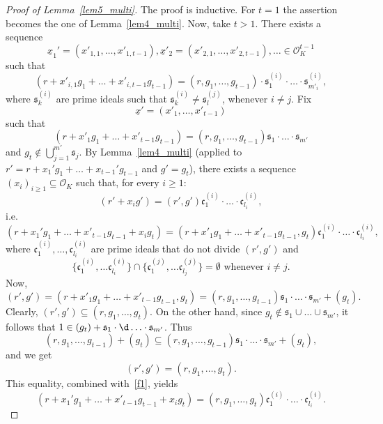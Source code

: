 \documentclass[leqno,a4paper,12pt]{article}
\theoremstyle{definition}
\newcommand{\OK}{\mathcal{O}_K}
\begin{document}
%
%
%
\begin{proof}[Proof of Lemma~\ref{lem5_multi}]
The proof is inductive. For $t=1$ the assertion becomes the one of Lemma~\ref{lem4_multi}. Now, take $t>1$. There exists a sequence
\[
\underline{x}_1'=(x'_{1,1},\dots,x'_{1,t-1}),\underline{x}'_2=(x'_{2,1},\dots,x'_{2,t-1}),\dots \in \OK^{t-1}
\]
such that
\[
(r+x'_{i,1}g_1+\dots+x'_{i,t-1}g_{t-1})=(r,g_1,\dots,g_{t-1})\cdot \mathfrak{s}_1^{(i)}\cdot\ldots\cdot\mathfrak{s}_{m'_i}^{(i)},
\]
where $\mathfrak{s}_k^{(i)}$ are prime ideals such that $\mathfrak{s}_k^{(i)}\neq \mathfrak{s}_l^{(j)}$, whenever $i\neq j$. Fix
\[
\underline{x}'=(x'_1,\dots,x'_{t-1})
\]
such that
\[
(r+x'_1g_1+\dots+x'_{t-1}g_{t-1})=(r,g_1,\dots,g_{t-1})\mathfrak{s}_1\cdot\ldots\cdot\mathfrak{s}_{m'}
\]
and $g_t\not\in\bigcup_{j=1}^{m'}\mathfrak{s}_j$. By Lemma~\ref{lem4_multi} (applied to $r'=r+x_1'g_1+\dots +x_{t-1}'g_{t-1}$ and $g'=g_t$), there exists a sequence $(x_i)_{i\geq 1}\subseteq \OK$ such that, for every $i\ge 1$:
\begin{equation}\label{f1}
(r'+x_ig')=(r',g')\mathfrak{c}_1^{(i)}\cdot\ldots\cdot \mathfrak{c}^{(i)}_{l_i},
\end{equation}
i.e.\
\[
(r+x_1'g_1+\dots+x'_{t-1}g_{t-1}+x_ig_t)=(r+x'_1g_1+\dots+x'_{t-1}g_{t-1},g_t)\mathfrak{c}_1^{(i)}\cdot\ldots\cdot\mathfrak{c}^{(i)}_{l_i},
\]
where $\mathfrak{c}^{(i)}_1,\dots,\mathfrak{c}^{(i)}_{l_i}$ are prime ideals that do not divide $(r',g')$ and
\[
\{\mathfrak{c}^{(i)}_1,\dots\mathfrak{c}^{(i)}_{l_i}\}\cap\{\mathfrak{c}^{(j)}_1,\dots\mathfrak{c}^{(j)}_{l_j}\}=\emptyset \text{ whenever }i\neq j.
\]
Now,
\[
(r',g')=(r+x'_1g_1+\dots+x'_{t-1}g_{t-1},g_t)=(r,g_1,\dots,g_{t-1})\mathfrak{s}_1\cdot\ldots\cdot\mathfrak{s}_{m'}+(g_t).
\]
Clearly,  $(r',g')\subseteq (r,g_1,\dots,g_{t})$. On the other hand, 
since $g_t\notin \mathfrak{s}_1\cup\ldots\cup\mathfrak{s}_{m'}$, it follows that  $1\in (g_t)+\mathfrak{s}_1\cdot\d\ldots\cdot\mathfrak{s}_{m'}$. Thus   
\[
(r,g_1,\dots,g_{t-1})+(g_t)\subseteq (r,g_1,\dots,g_{t-1})\mathfrak{s}_1\cdot\ldots\cdot\mathfrak{s}_{m'}+(g_t),
\]
and we get
\[
(r',g')=(r,g_1,\dots,g_t).
\]
This equality, combined with~\eqref{f1}, yields
\[
(r+x_1'g_1+\dots+x'_{t-1}g_{t-1}+x_ig_t)=(r,g_1,\dots,g_t)\mathfrak{c}_1^{(i)}\cdot\ldots\cdot\mathfrak{c}_{l_i}^{(i)}.
\]
\end{proof}
\end{document}
